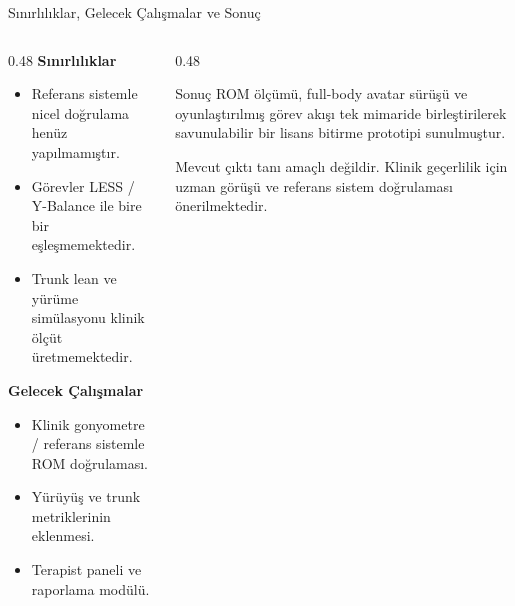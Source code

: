 \documentclass[aspectratio=169,12pt]{beamer}
\begin{document}
\begin{frame}[shrink=8]{S\i{}n\i{}rl\i{}l\i{}klar, Gelecek \c{C}al\i{}\c{s}malar ve Sonu\c{c}}
  \begin{columns}[T]
    \begin{column}{0.48\textwidth}
      \textcolor{pvred}{\textbf{S\i{}n\i{}rl\i{}l\i{}klar}}
      \begin{itemize}\setlength\itemsep{0.15em}
        \item Referans sistemle nicel do\u{g}rulama hen\"{u}z yap\i{}lmam\i{}\c{s}t\i{}r.
        \item G\"{o}revler LESS / Y-Balance ile bire bir e\c{s}le\c{s}memektedir.
        \item Trunk lean ve y\"{u}r\"{u}me sim\"{u}lasyonu klinik
              \"{o}l\c{c}\"{u}t \"{u}retmemektedir.
      \end{itemize}

      \vspace{0.3em}
      \textcolor{pvred}{\textbf{Gelecek \c{C}al\i{}\c{s}malar}}
      \begin{itemize}\setlength\itemsep{0.15em}
        \item Klinik gonyometre / referans sistemle ROM do\u{g}rulamas\i{}.
        \item Y\"{u}r\"{u}y\"{u}\c{s} ve trunk metriklerinin eklenmesi.
        \item Terapist paneli ve raporlama mod\"{u}l\"{u}.
      \end{itemize}
    \end{column}

    \begin{column}{0.48\textwidth}
      \begin{block}{Sonu\c{c}}
        \small ROM \"{o}l\c{c}\"{u}m\"{u}, full-body avatar s\"{u}r\"{u}\c{s}\"{u} ve
        oyunla\c{s}t\i{}r\i{}lm\i{}\c{s} g\"{o}rev ak\i{}\c{s}\i{} tek mimaride
        birle\c{s}tirilerek savunulabilir bir lisans bitirme prototipi sunulmu\c{s}tur.
      \end{block}
      \vspace{0.15em}
      \scriptsize Mevcut \c{c}\i{}kt\i{} tan\i{} ama\c{c}l\i{} de\u{g}ildir.
      Klinik ge\c{c}erlilik i\c{c}in uzman g\"{o}r\"{u}\c{s}\"{u} ve referans
      sistem do\u{g}rulamas\i{} \"{o}nerilmektedir.
    \end{column}
  \end{columns}
\end{frame}
\end{document}
